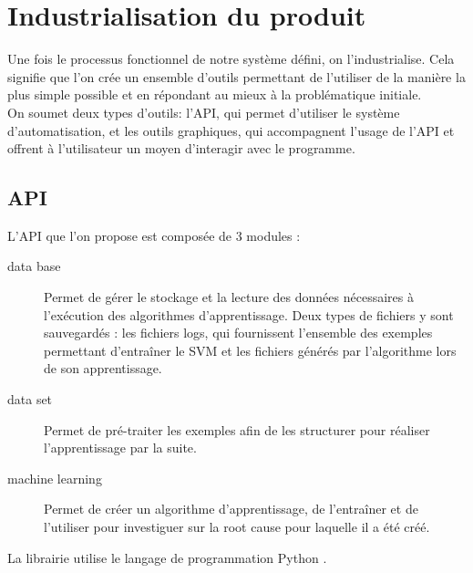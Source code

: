 \chapter{Industrialisation du produit}
\label{Industrialisation du produit}
\thispagestyle{fancy}
Une fois le processus fonctionnel de notre système défini, on l'industrialise. Cela signifie que l'on crée un ensemble d'outils permettant de l'utiliser de la manière la plus simple possible et en répondant au mieux à la problématique initiale. \\
On soumet deux types d'outils: l'API, qui permet d'utiliser le système d'automatisation, et les outils graphiques, qui accompagnent l'usage de l'API et offrent à l'utilisateur un moyen d'interagir avec le programme.  

\section{API}
\label{Industrialisation du produit: API}
L'API que l'on propose est composée de 3 modules :
\begin{description}
	\item [data base] Permet de gérer le stockage et la lecture des données nécessaires à l'exécution des algorithmes d'apprentissage. Deux types de fichiers y sont sauvegardés : les fichiers logs, qui fournissent l'ensemble des exemples permettant d'entraîner le SVM et les fichiers générés par l'algorithme lors de son apprentissage.
	\item [data set] Permet de pré-traiter les exemples afin de les structurer pour réaliser l'apprentissage par la suite.
	\item [machine learning] Permet de créer un algorithme d'apprentissage, de l'entraîner et de l'utiliser pour investiguer sur la root cause pour laquelle il a été créé.
\end{description}

La librairie utilise le langage de programmation Python \cite{Python}. \\


